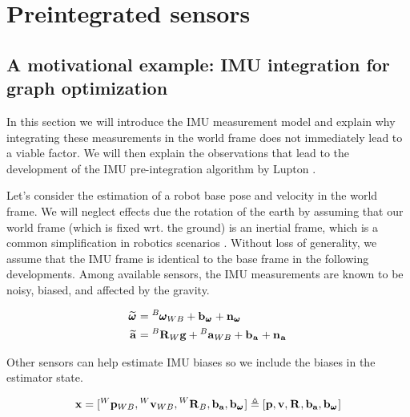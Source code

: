 \chapter{Preintegrated sensors}
\minitoc

  
\section{A motivational example: IMU integration for graph optimization}
In this section we will introduce the IMU measurement model and explain why integrating these measurements in the world frame does not immediately
lead to a viable factor. We will then explain the observations that lead to the development of the IMU pre-integration algorithm by Lupton \cite{lupton-09}.

Let's consider the estimation of a robot base pose and velocity in the world frame. We will neglect effects due the rotation of the earth by assuming 
that our world frame (which is fixed wrt. the ground) is an inertial frame, which
is a common simplification in robotics scenarios \cite{forster2017-TRO}. Without loss of generality, we assume that the IMU frame is identical to the base frame 
in the following developments. Among available sensors, the IMU measurements are known to be noisy, biased, and affected by the gravity.

\begin{equation}
    \begin{split}
    \prescript{}{}{\widetilde{\pmb{\omega}}}_{} &= \prescript{B}{}{\pmb{\omega}}_{WB} + {\bf b}_{\prescript{}{}{\pmb{\omega}}_{}} + {\bf n}_{\prescript{}{}{\pmb{\omega}}_{}} 
    \\
    \prescript{}{}{\widetilde{{\bf a}}}_{}    &= \prescript{B}{}{{\bf R}}_{W} {\bf g} + \prescript{B}{}{{\bf a}}_{WB} + {\bf b}_{\prescript{}{}{{\bf a}}_{}} + {\bf n}_{\prescript{}{}{{\bf a}}_{}} 
    \end{split}
    \label{eq:imu_meas_model}
\end{equation}
    
Other sensors can help estimate IMU biases so we include the biases in the estimator state.

\begin{equation}
    {\bf x} = [\prescript{W}{}{{\bf p}}_{WB}, \prescript{W}{}{{\bf v}}_{WB}, \prescript{W}{}{{\bf R}}_{B}, {\bf b}_{{\bf a}}, {\bf b}_{\prescript{}{}{\pmb{\omega}}_{}}]
    \triangleq 
    [{\bf p}, {\bf v}, \prescript{}{}{{\bf R}}_{}, {\bf b}_{{\bf a}}, {\bf b}_{\prescript{}{}{\pmb{\omega}}_{}}] 
\end{equation}

